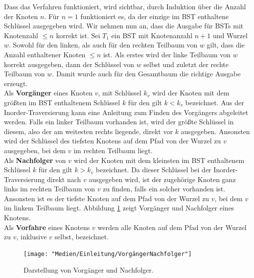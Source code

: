 \documentclass[a4paper,12pt]{article}
\begin{document}
\noindent Dass das Verfahren funktioniert, wird sichtbar, durch Induktion über die Anzahl der Knoten $n$.
Für $n = 1$ funktioniert es, da der einzige im BST enthaltene Schlüssel ausgegeben wird. Wir nehmen nun an, dass die Ausgabe für BSTs mit Knotenzahl $\leq n$ korrekt ist. Sei $T_1$ ein BST mit Knotenanzahl $n + 1$ und Wurzel $w$. Sowohl für den linken, als auch für den rechten Teilbaum von $w$ gilt, dass die Anzahl enthaltener Knoten $\leq n$ ist. Als erstes wird der linke Teilbaum von $w$ korrekt ausgegeben, dann der Schlüssel von $w$ selbst und zuletzt der rechte Teilbaum von $w$. Damit wurde auch für den Gesamtbaum die richtige
Ausgabe erzeugt. \\
Als \textbf{Vorgänger} eines Knoten $v$, mit Schlüssel $k_v$ wird der Knoten mit dem größten im BST enthaltenem Schlüssel $k$ für den gilt $k < k_v$ bezeichnet. Aus der Inorder-Traversierung kann eine Anleitung zum Finden des Vorgängers abgeleitet werden. Falls ein linker Teilbaum vorhanden ist, wird der größte Schlüssel in diesem, also der am weitesten rechts liegende, direkt vor $k$ ausgegeben. Ansonsten wird der Schlüssel des tiefsten Knotens auf dem Pfad von der Wurzel zu $v$ ausgegeben, bei dem $v$ im rechten Teilbaum liegt. \\
Als \textbf{Nachfolger} von $v$ wird der Knoten mit dem kleinsten im BST enthaltenem Schlüssel $k$ für den gilt $k > k_v$ bezeichnet. Da dieser Schlüssel bei der Inorder-Traversierung direkt nach $v$ ausgegeben wird, ist der zugehörige Knoten ganz links im rechten Teilbaum von $v$ zu finden, falls ein solcher vorhanden ist. Ansonsten ist es der tiefste Knoten auf dem Pfad von der Wurzel zu $v$, bei dem $v$ im linkem Teilbaum liegt. Abbildung \ref{fig:VorgängerNachfolger} zeigt Vorgänger und Nachfolger eines Knotens.\\
 Als \textbf{Vorfahre} eines Knotens $v$ werden alle Knoten auf dem Pfad von der Wurzel zu $v$, inklusive $v$ selbst, bezeichnet. 

\begin{figure}[H]
	\centering
	\texttt{[image: "Medien/Einleitung/VorgängerNachfolger"]}
	\caption{Darstellung von Vorgänger und Nachfolger. }
	\label{fig:VorgängerNachfolger}
\end{figure}
\end{document}
